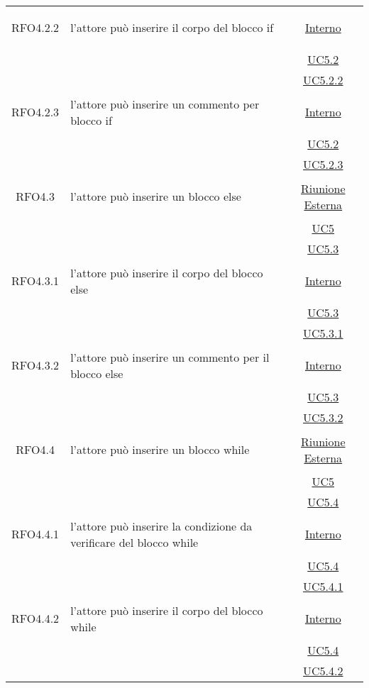 \begin{longtable}{|c|>{\centering}m{7cm}|c|}
\hypertarget{RFO4.2.2}{RFO4.2.2} & l'attore può inserire il corpo del blocco if & \hyperlink{Interno}{Interno}\\
& &\hyperref[UC5.2]{UC5.2}\\
& &\hyperref[UC5.2.2]{UC5.2.2}\\ \hline

\hypertarget{RFO4.2.3}{RFO4.2.3} & l'attore può inserire un commento per blocco if & \hyperlink{Interno}{Interno}\\
& &\hyperref[UC5.2]{UC5.2}\\
& &\hyperref[UC5.2.3]{UC5.2.3}\\ \hline

\hypertarget{RFO4.3}{RFO4.3} & l'attore può inserire un blocco else & \hyperlink{Riunione Esterna}{Riunione Esterna}\\
& &\hyperref[UC5]{UC5}\\
& &\hyperref[UC5.3]{UC5.3}\\ \hline

\hypertarget{RFO4.3.1}{RFO4.3.1} & l'attore può inserire il corpo del blocco else &\hyperlink{Interno}{Interno}\\
& &\hyperref[UC5.3]{UC5.3}\\
& &\hyperref[UC5.3.1]{UC5.3.1}\\ \hline

\hypertarget{RFO4.3.2}{RFO4.3.2} & l'attore può inserire un commento per il blocco else & \hyperlink{Interno}{Interno}\\
& &\hyperref[UC5.3]{UC5.3}\\
& &\hyperref[UC5.3.2]{UC5.3.2}\\ \hline

\hypertarget{RFO4.4}{RFO4.4} & l'attore può inserire un blocco while & \hyperlink{Riunione Esterna}{Riunione Esterna}\\
& &\hyperref[UC5]{UC5}\\
& &\hyperref[UC5.4]{UC5.4}\\ \hline

\hypertarget{RFO4.4.1}{RFO4.4.1} & l'attore può inserire la condizione da verificare del blocco while & \hyperlink{Interno}{Interno}\\
& &\hyperref[UC5.4]{UC5.4}\\
& &\hyperref[UC5.4.1]{UC5.4.1}\\ \hline

\hypertarget{RFO4.4.2}{RFO4.4.2} & l'attore può inserire il corpo del blocco while & \hyperlink{Interno}{Interno}\\
& &\hyperref[UC5.4]{UC5.4}\\
& &\hyperref[UC5.4.2]{UC5.4.2}\\ \hline


\end{longtable}
